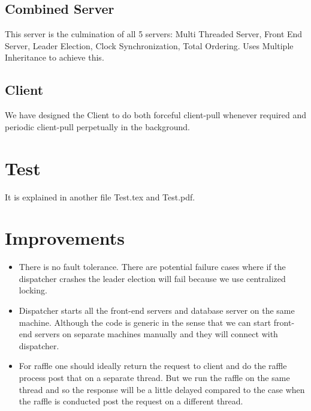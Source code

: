 \documentclass{article}
\begin{document}
\subsection{Combined Server}
This server is the culmination of all 5 servers: Multi Threaded Server, 
Front End Server, Leader Election, Clock Synchronization, Total Ordering.
Uses Multiple Inheritance to achieve this.

\subsection{Client}
We have designed the Client to do both forceful client-pull whenever required and periodic client-pull perpetually in the background.

\section{Test}
It is explained in another file Test.tex and Test.pdf.

\section{Improvements}
\begin{itemize}
\item There is no fault tolerance. There are potential failure cases where if the dispatcher crashes the leader election will fail because we use centralized locking.
\item Dispatcher starts all the front-end servers and database server on the same machine. Although the code is generic in the sense that we can start front-end servers on separate machines manually and they will connect with dispatcher.
\item For raffle one should ideally return the request to client and do the raffle process post that on a separate thread. But we run the raffle on the same thread and so the response will be a little delayed compared to the case when the raffle is conducted post the request on a different thread.
\end{itemize}
\end{document}

